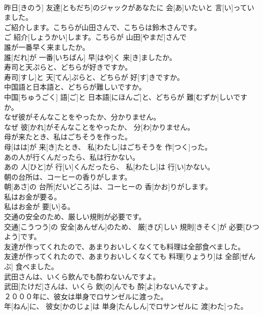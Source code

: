 \documentclass[8pt]{extreport}
\begin{document}
\begin{CJK}{UTF8}{min}
\\	昨日[きのう] 友達[ともだち]のジャックがあなたに 会[あ]いたいと 言[い]っていました。	
\\	ご紹介します。こちらが山田さんで、こちらは鈴木さんです。	
\\	ご 紹介[しょうかい]します。こちらが 山田[やまだ]さんで	
\\	誰が一番早く来ましたか。	
\\	誰[だれ]が 一番[いちばん] 早[はや]く 来[き]ましたか。	
\\	寿司と天ぷらと、どちらが好きですか。	
\\	寿司[すし]と 天[てん]ぷらと、どちらが 好[す]きですか。	
\\	中国語と日本語と、どちらが難しいですか。	
\\	中国[ちゅうごく] 語[ご]と 日本語[にほんご]と、どちらが 難[むずか]しいですか。	
\\	なぜ彼がそんなことをやったか、分かりません。	
\\	なぜ 彼[かれ]がそんなことをやったか、 分[わ]かりません。	
\\	母が来たとき、私はごちそうを作った。	
\\	母[はは]が 来[き]たとき、 私[わたし]はごちそうを 作[つく]った。	
\\	あの人が行くんだったら、私は行かない。	
\\	あの 人[ひと]が 行[い]くんだったら、 私[わたし]は 行[い]かない。	
\\	朝の台所は、コーヒーの香りがします。	
\\	朝[あさ]の 台所[だいどころ]は、コーヒーの 香[かお]りがします。	
\\	私はお金が要る。	
\\	私はお金が 要[い]る。	
\\	交通の安全のため、厳しい規則が必要です。	
\\	交通[こうつう]の 安全[あんぜん]のため、 厳[きび]しい 規則[きそく]が 必要[ひつよう]です。	
\\	友達が作ってくれたので、あまりおいしくなくても料理は全部食べました。	
\\	友達が作ってくれたので、あまりおいしくなくても 料理[りょうり]は 全部[ぜんぶ] 食べました。	
\\	武田さんは、いくら飲んでも酔わないんですよ。	
\\	武田[たけだ]さんは、いくら 飲[の]んでも 酔[よ]わないんですよ。	
\\	２０００年に、彼女は単身でロサンゼルに渡った。	
\\	年[ねん]に、 彼女[かのじょ]は 単身[たんしん]でロサンゼルに 渡[わた]った。	

\end{CJK}
\end{document}
